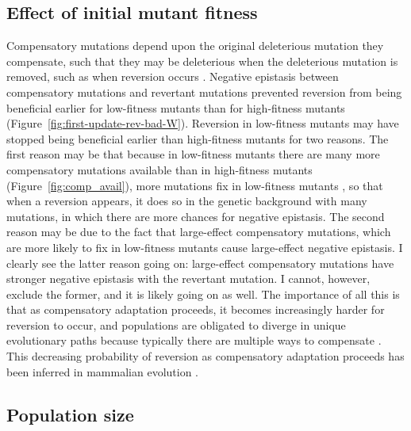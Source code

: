\begin{doublespace}
\subsection{Effect of initial mutant fitness}

Compensatory mutations depend upon the original deleterious mutation
they compensate, such that they may be deleterious when the deleterious mutation
is removed, such as when reversion occurs \citep{sch97,poo05,lev00}.
%
Negative epistasis between compensatory mutations and revertant mutations
prevented reversion from being beneficial earlier for low-fitness mutants
than for high-fitness mutants (Figure~\ref{fig:first-update-rev-bad-W}).
%
Reversion in low-fitness mutants may have stopped being beneficial earlier
than high-fitness mutants for two reasons.
%
The first reason may be that because in low-fitness mutants
there are many more compensatory mutations available
than in high-fitness mutants (Figure~\ref{fig:comp_avail}),
more mutations fix in low-fitness mutants \citep{moo00,san05}, so that
when a reversion appears, it does so in the genetic background
with many mutations, in which there are more chances for negative epistasis.
%
The second reason may be due to the fact that large-effect
compensatory mutations, which are more likely to fix in low-fitness mutants
cause large-effect negative epistasis.
%
I clearly see the latter reason going on: large-effect compensatory mutations
have stronger negative epistasis with the revertant mutation.
%
I cannot, however, exclude the former, and it is likely going on as well.
%
The importance of all this is that as compensatory adaptation proceeds,
it becomes increasingly harder for reversion to occur,
and populations are obligated to diverge in unique evolutionary paths
because typically there are multiple ways to compensate \citep{pau07}.
%
This decreasing probability of reversion as compensatory adaptation proceeds
has been inferred in mammalian evolution \citep{soy12}.



\subsection{Population size}


\end{doublespace}
